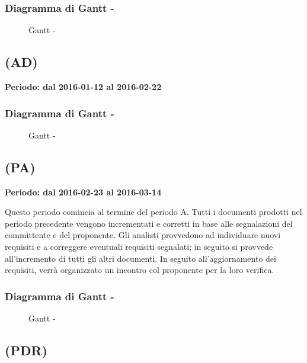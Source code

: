 \documentclass[./PianoDiProgetto.tex]{subfiles}
\begin{document}
  \subsubsection{Diagramma di Gantt - \PerAR}
    \begin{figure}[!h]
    \centering
    \caption{Gantt - \PerAR}
    \end{figure}

	\subsection{\PerAD{} (AD)}
  \textbf{Periodo: dal 2016-01-12 al 2016-02-22}

  \subsubsection{Diagramma di Gantt - \PerAD}
    \begin{figure}[!h]
    \centering
    \caption{Gantt - \PerAD}
    \end{figure}

  \subsection{\PerPA{} (PA)}
  \textbf{Periodo: dal 2016-02-23 al 2016-03-14}

  Questo periodo comincia al termine del periodo A. Tutti i documenti prodotti nel periodo precedente vengono incrementati e corretti in base alle segnalazioni del committente e del proponente. Gli analisti provvedono ad individuare nuovi requisiti e a correggere eventuali requisiti segnalati; in seguito si provvede all'incremento di tutti gli altri documenti. In seguito all'aggiornamento dei requisiti, verrà organizzato un incontro col proponente per la loro verifica.
  \subsubsection{Diagramma di Gantt - \PerPA}
    \begin{figure}[!h]
    \centering
    \caption{Gantt - \PerPA}
    \end{figure}

  \subsection{\PerPDR[]{} (PDR)}
\end{document}
